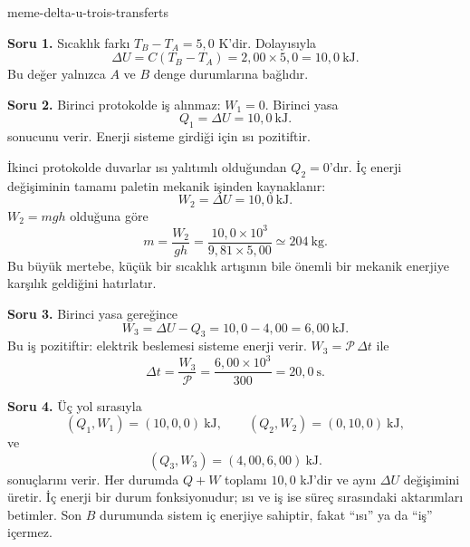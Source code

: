 \begin{exo}{meme-delta-u-trois-transferts}
\begin{solution}
\textbf{Soru 1.} Sıcaklık farkı $T_B-T_A=5{,}0$ K'dir. Dolayısıyla
\[
\Delta U=C(T_B-T_A)
=2{,}00\times5{,}0
=10{,}0\ \mathrm{kJ}.
\]
Bu değer yalnızca $A$ ve $B$ denge durumlarına bağlıdır.

\textbf{Soru 2.} Birinci protokolde iş alınmaz: $W_1=0$. Birinci yasa
\[
Q_1=\Delta U=10{,}0\ \mathrm{kJ}.
\]
sonucunu verir. Enerji sisteme girdiği için ısı pozitiftir.

İkinci protokolde duvarlar ısı yalıtımlı olduğundan $Q_2=0$'dır. İç enerji
değişiminin tamamı paletin mekanik işinden kaynaklanır:
\[
W_2=\Delta U=10{,}0\ \mathrm{kJ}.
\]
$W_2=mgh$ olduğuna göre
\[
m=\frac{W_2}{gh}
=\frac{10{,}0\times10^3}{9{,}81\times5{,}00}
\simeq 204\ \mathrm{kg}.
\]
Bu büyük mertebe, küçük bir sıcaklık artışının bile önemli bir mekanik
enerjiye karşılık geldiğini hatırlatır.

\textbf{Soru 3.} Birinci yasa gereğince
\[
W_3=\Delta U-Q_3=10{,}0-4{,}00=6{,}00\ \mathrm{kJ}.
\]
Bu iş pozitiftir: elektrik beslemesi sisteme enerji verir. $W_3=\mathcal P\,\Delta t$ ile
\[
\Delta t=\frac{W_3}{\mathcal P}
=\frac{6{,}00\times10^3}{300}
=20{,}0\ \mathrm{s}.
\]

\textbf{Soru 4.} Üç yol sırasıyla
\[
(Q_1,W_1)=(10{,}0,0)\ \mathrm{kJ},
\qquad
(Q_2,W_2)=(0,10{,}0)\ \mathrm{kJ},
\]
ve
\[
(Q_3,W_3)=(4{,}00,6{,}00)\ \mathrm{kJ}.
\]
sonuçlarını verir. Her durumda $Q+W$ toplamı $10{,}0$ kJ'dir ve aynı
$\Delta U$ değişimini üretir. İç enerji bir durum fonksiyonudur; ısı ve iş ise
süreç sırasındaki aktarımları betimler. Son $B$ durumunda sistem iç enerjiye
sahiptir, fakat “ısı” ya da “iş” içermez.
\end{solution}
\end{exo}


